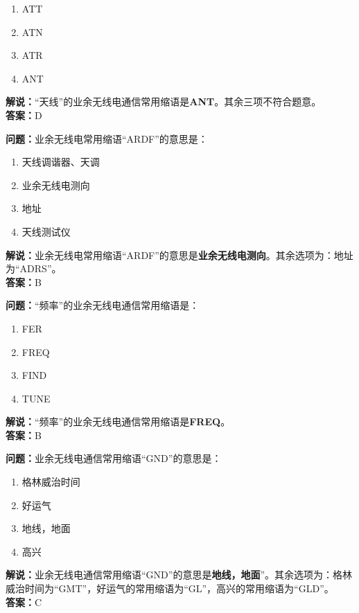 \begin{enumerate}[label=\Alph*), leftmargin=1.5cm]
	\item ATT
	\item ATN
	\item ATR
	\item ANT
\end{enumerate}

\textbf{解说：}“天线”的业余无线电通信常用缩语是\textbf{ANT}。其余三项不符合题意。\\\textbf{答案：}D



\textbf{问题：}业余无线电常用缩语“ARDF”的意思是：

\begin{enumerate}[label=\Alph*), leftmargin=1.5cm]
	\item 天线调谐器、天调
	\item 业余无线电测向
	\item 地址
	\item 天线测试仪
\end{enumerate}

\textbf{解说：}业余无线电常用缩语“ARDF”的意思是\textbf{业余无线电测向}。其余选项为：地址为“ADRS”。\\\textbf{答案：}B



\textbf{问题：}“频率”的业余无线电通信常用缩语是：
\begin{enumerate}[label=\Alph*), leftmargin=1.5cm]
	\item FER
	\item FREQ
	\item FIND
	\item TUNE
\end{enumerate}

\textbf{解说：}“频率”的业余无线电通信常用缩语是\textbf{FREQ}。\\\textbf{答案：}B


\textbf{问题：}业余无线电通信常用缩语“GND”的意思是：

\begin{enumerate}[label=\Alph*), leftmargin=1.5cm]
	\item 格林威治时间
	\item 好运气
	\item 地线，地面
	\item 高兴
\end{enumerate}

\textbf{解说：}业余无线电通信常用缩语“GND”的意思是\textbf{地线，地面}”。其余选项为：格林威治时间为“GMT”，好运气的常用缩语为“GL”，高兴的常用缩语为“GLD”。\\\textbf{答案：}C



